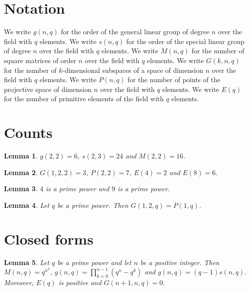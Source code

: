 \documentclass{article}
\newtheorem{lemma}{Lemma}
\begin{document}
\section{Notation}

We write $g(n,q)$ for the order of the general linear group of degree $n$ over the field with $q$ elements.
We write $s(n,q)$ for the order of the special linear group of degree $n$ over the field with $q$ elements.
We write $M(n,q)$ for the number of square matrices of order $n$ over the field with $q$ elements.
We write $G(k,n,q)$ for the number of $k$-dimensional subspaces of a space of dimension $n$ over the field with $q$ elements.
We write $P(n,q)$ for the number of points of the projective space of dimension $n$ over the field with $q$ elements.
We write $E(q)$ for the number of primitive elements of the field with $q$ elements.

\section{Counts}

\begin{lemma}\label{groups}
$g(2,2)=6$, $s(2,3)=24$ and $M(2,2)=16$.
\end{lemma}

\begin{lemma}\label{subspaces}
$G(1,2,2)=3$, $P(2,2)=7$, $E(4)=2$ and $E(8)=6$.
\end{lemma}

\begin{lemma}\label{powers}
$4$ is a prime power and $9$ is a prime power.
\end{lemma}

\begin{lemma}\label{lines}
Let $q$ be a prime power. Then $G(1,2,q)=P(1,q)$.
\end{lemma}

\section{Closed forms}

\begin{lemma}\label{closed}
Let $q$ be a prime power and let $n$ be a positive integer. Then $M(n,q)=q^{n^2}$, $g(n,q)=\prod_{k=0}^{n-1}(q^n-q^k)$ and $g(n,q)=(q-1)s(n,q)$. Moreover, $E(q)$ is positive and $G(n+1,n,q)=0$.
\end{lemma}
\end{document}

